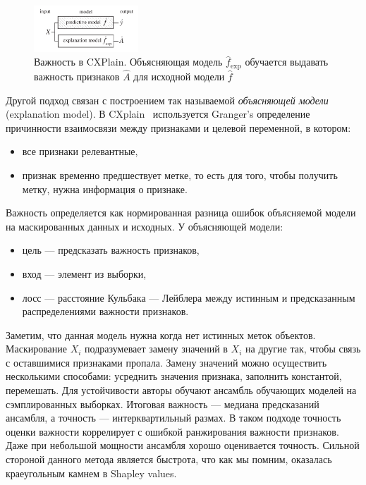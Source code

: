 \documentclass[12pt]{article}
\begin{document}
\begin{figure}
\centering
\includegraphics[width=0.35\textwidth]{images/exp_model.png}
\caption{\label{fig:exp_model}\centering Важность в CXPlain. Объясняющая модель $\hat{f}_{\exp }$ обучается выдавать важность признаков $\hat{A}$ для исходной модели $\hat{f}$~\citep{CXplain}}
\end{figure}
Другой подход связан с построением так называемой \emph{объясняющей модели} (explanation model). В CXplain~\citep{CXplain} используется Granger's определение причинности взаимосвязи между признаками и целевой переменной, в котором:
\begin{itemize}[noitemsep]
    \item все признаки релевантные,
    \item признак временно предшествует метке, то есть для того, чтобы получить метку, нужна информация о признаке.
\end{itemize}
Важность определяется как нормированная разница ошибок объясняемой модели на маскированных данных и исходных. У объясняющей модели:
\begin{itemize}[noitemsep]
    \item цель --- предсказать важность признаков,
    \item вход --- элемент из выборки,
    \item лосс --- расстояние Кульбака — Лейблера между истинным и предсказанным распределениями важности признаков.
\end{itemize}
Заметим, что данная модель нужна когда нет истинных меток объектов. Маскирование  $X_i$ подразумевает замену значений в $X_i$ на другие так, чтобы связь с оставшимися признаками пропала. Замену значений можно осуществить несколькими способами: усреднить значения признака, заполнить константой, перемешать. Для устойчивости авторы обучают ансамбль обучающих моделей на сэмплированных выборках. Итоговая важность --- медиана предсказаний ансамбля, а точность --- интерквартильный размах. В таком подходе точность оценки важности коррелирует с ошибкой ранжирования важности признаков. Даже  при небольшой мощности ансамбля хорошо оценивается точность. Сильной стороной данного метода является быстрота, что как мы помним, оказалась краеугольным камнем в Shapley values.
\end{document}
